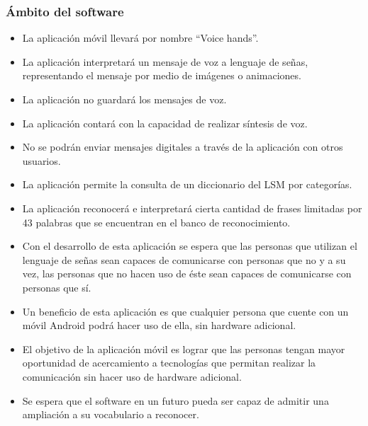 

\subsubsection{Ámbito del software}

\begin{itemize}
\item	La aplicación móvil llevará por nombre “Voice hands”.
\item	La aplicación interpretará un mensaje de voz a lenguaje de señas, representando el mensaje por medio de imágenes o animaciones.
\item	La aplicación no guardará los mensajes de voz.
\item	La aplicación contará con la capacidad de realizar síntesis de voz.
\item	No se podrán enviar mensajes digitales a través de la aplicación con otros usuarios.
\item	La aplicación permite la consulta de un diccionario del LSM por categorías.
\item	La aplicación reconocerá e interpretará cierta cantidad de frases limitadas por 43 palabras que se encuentran en el banco de reconocimiento.
\item	Con el desarrollo de esta aplicación se espera que las personas que utilizan el lenguaje de señas sean capaces de comunicarse con personas que no y a su vez, las personas que no hacen uso de éste sean capaces de comunicarse con personas que sí.
\item	Un beneficio de esta aplicación es que cualquier persona que cuente con un móvil Android podrá hacer uso de ella, sin hardware adicional.
\item	El objetivo de la aplicación móvil es lograr que las personas tengan mayor oportunidad de acercamiento a tecnologías que permitan realizar la comunicación sin hacer uso de hardware adicional.
\item	Se espera que el software en un futuro pueda ser capaz de admitir una ampliación a su vocabulario a reconocer.
\end{itemize}

